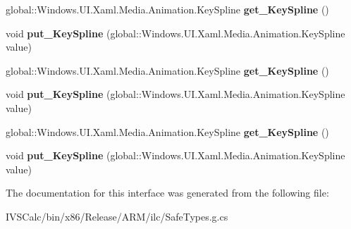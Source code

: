 \begin{DoxyCompactItemize}
\item 
\mbox{\label{interface_windows_1_1_u_i_1_1_xaml_1_1_media_1_1_animation_1_1_i_spline_double_key_frame_aee332ff2916f272429ecd7f6fc5770c9}} 
global\+::\+Windows.\+U\+I.\+Xaml.\+Media.\+Animation.\+Key\+Spline {\bfseries get\+\_\+\+Key\+Spline} ()
\item 
\mbox{\label{interface_windows_1_1_u_i_1_1_xaml_1_1_media_1_1_animation_1_1_i_spline_double_key_frame_a4087bb722a940f2afe1d67aba5809f5e}} 
void {\bfseries put\+\_\+\+Key\+Spline} (global\+::\+Windows.\+U\+I.\+Xaml.\+Media.\+Animation.\+Key\+Spline value)
\item 
\mbox{\label{interface_windows_1_1_u_i_1_1_xaml_1_1_media_1_1_animation_1_1_i_spline_double_key_frame_aee332ff2916f272429ecd7f6fc5770c9}} 
global\+::\+Windows.\+U\+I.\+Xaml.\+Media.\+Animation.\+Key\+Spline {\bfseries get\+\_\+\+Key\+Spline} ()
\item 
\mbox{\label{interface_windows_1_1_u_i_1_1_xaml_1_1_media_1_1_animation_1_1_i_spline_double_key_frame_a4087bb722a940f2afe1d67aba5809f5e}} 
void {\bfseries put\+\_\+\+Key\+Spline} (global\+::\+Windows.\+U\+I.\+Xaml.\+Media.\+Animation.\+Key\+Spline value)
\item 
\mbox{\label{interface_windows_1_1_u_i_1_1_xaml_1_1_media_1_1_animation_1_1_i_spline_double_key_frame_aee332ff2916f272429ecd7f6fc5770c9}} 
global\+::\+Windows.\+U\+I.\+Xaml.\+Media.\+Animation.\+Key\+Spline {\bfseries get\+\_\+\+Key\+Spline} ()
\item 
\mbox{\label{interface_windows_1_1_u_i_1_1_xaml_1_1_media_1_1_animation_1_1_i_spline_double_key_frame_a4087bb722a940f2afe1d67aba5809f5e}} 
void {\bfseries put\+\_\+\+Key\+Spline} (global\+::\+Windows.\+U\+I.\+Xaml.\+Media.\+Animation.\+Key\+Spline value)
\end{DoxyCompactItemize}


The documentation for this interface was generated from the following file\+:\begin{DoxyCompactItemize}
\item 
I\+V\+S\+Calc/bin/x86/\+Release/\+A\+R\+M/ilc/Safe\+Types.\+g.\+cs\end{DoxyCompactItemize}
